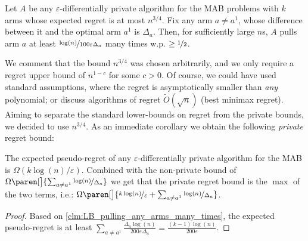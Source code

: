 \documentclass{article}
\DeclarePairedDelimiter{\paren}()
\begin{document}
\begin{claim}
\label{clm:LB_pulling_any_arms_many_times}
Let $A$ be any $\varepsilon$-differentially private algorithm for the MAB problems with $k$ arms whose expected regret is at most $n^{3/4}$. Fix any arm $a\neq a^1$, whose difference between it and the optimal arm $a^1$ is $\Delta_a$. Then, for sufficiently large $n$s, $A$ pulls arm $a$ at least $\nicefrac {\log(n)}{100\varepsilon\Delta_a}$ many times w.p. $\geq \nicefrac 1 2$.
\end{claim}
\vspace{-\parskip}
We comment that the bound $n^{3/4}$ was chosen arbitrarily, and we only require a regret upper bound of $n^{1-c}$ for some $c>0$. Of course, we could have used standard assumptions, where the regret is asymptotically smaller than \emph{any} polynomial; or discuss algorithms of regret $\tilde O(\sqrt n)$ (best minimax regret). Aiming to separate the standard lower-bounds on regret from the private bounds, we decided to use $n^{3/4}$.
As an immediate corollary we obtain the following \emph{private} regret bound:
\begin{corollary}
\label{cor:LB_private_MAB}
The expected pseudo-regret of any $\varepsilon$-differentially private algorithm for the MAB is $\Omega(k\log(n)/\varepsilon)$. Combined with the non-private bound of $\Omega\paren[\big]{\sum_{a\neq a^1} \nicefrac{\log(n)}{\Delta_a}}$ we get that the private regret bound is the $\max$ of the two terms, i.e.: $\Omega\paren[\big]{\nicefrac {k\log(n)}{\varepsilon}+\sum_{a\neq a^1} \nicefrac{\log(n)}{\Delta_a}}$.
\end{corollary}
\vspace{-2.5\parskip}
\begin{proof}
  Based on \cref{clm:LB_pulling_any_arms_many_times}, the expected
  pseudo-regret is at least
  $\sum_{a\neq a^1}\tfrac{\Delta_a\log(n)}{200
    \varepsilon\Delta_a} = \tfrac{(k-1)\log(n)}{200\varepsilon}$.
\end{proof}
\vspace{-2.5\parskip}
\end{document}
